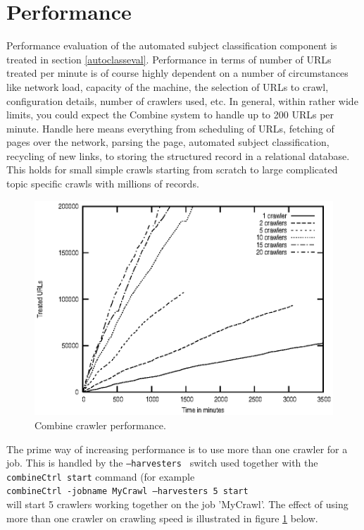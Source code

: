 \section{Performance}

Performance evaluation of the automated subject classification component is
treated in section \ref{autoclasseval}.
Performance in terms of number of URLs treated per minute is of course
highly dependent on a number of circumstances like network load,
capacity of the machine, the selection of URLs to crawl, configuration
details, number of crawlers used, etc.
In general, within rather wide limits, you could expect the Combine
system to handle up to 200 URLs per
minute. Handle here means everything from scheduling of URLs, fetching
of pages over the network, parsing the page,
automated subject classification, recycling of new links, to storing the structured record in
a relational database. This holds for small simple crawls starting
from scratch to large complicated topic specific crawls with millions
of records.

\begin{figure}[htb]
\begin{center}
 \includegraphics[height=0.4\textheight]{CrawlerSpeed.ps}
\end{center}
\caption{Combine crawler performance.}
\label{crawlspeed}
\end{figure}

The prime way of increasing performance is to use more than one
crawler for a job. This is handled by the {\tt --harvesters } switch
used together with the {\tt combineCtrl start} command (for example\\
{\tt combineCtrl -jobname MyCrawl --harvesters 5 start}\\
will start 5 crawlers working together on the job 'MyCrawl'. The
effect of using more than one crawler on crawling speed is illustrated
in figure \ref{crawlspeed} below.

